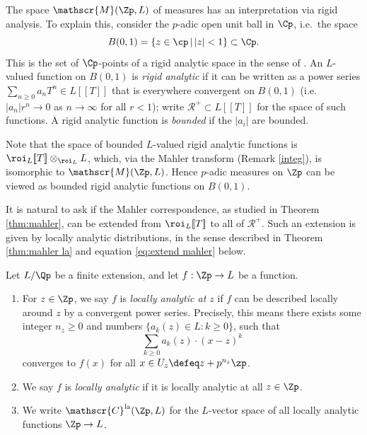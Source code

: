 \documentclass[a4paper,10pt, english, reqno]{smfart}
\newcommand{\lsem}{[\! [}
\newcommand{\rsem}{]\! ]}
\newcommand{\sM}{\mathscr{M}}
\newcommand{\sC}{\mathscr{C}}
\numberwithin{equation}{section}
\begin{document}
\begin{remark}\label{rem:analytic functions}
The space $\sM(\Zp,L)$ of measures has an interpretation via rigid analysis. To explain this, consider the $p$-adic open unit ball in $\Cp$, i.e.\ the space
\[
B(0, 1) = \{ z \in \cp \, | \, |z| < 1 \} \subset \Cp.
\]
This is the set of $\Cp$-points of a rigid analytic space in the sense of \cite{BGR}. An $L$-valued function on $B(0,1)$ is \emph{rigid analytic} if it can be written as a power series $\sum_{n \geq 0}a_n T^n \in L\lsem T\rsem$ that is everywhere convergent on $B(0,1)$ (i.e.\ $|a_n|r^n \to 0$ as $n \to \infty$ for all $r < 1$); write $\mathscr{R}^+ \subset L\lsem T\rsem$ for the space of such functions. A rigid analytic function is \emph{bounded} if the $|a_i|$ are bounded. 

Note that  the space of bounded $L$-valued rigid analytic functions is $\roi_L\lsem T\rsem  \otimes_{\roi_L} L$, which, via the Mahler transform (Remark \ref{integ}), is isomorphic to $\sM(\Zp,L)$. Hence $p$-adic measures on $\Zp$ can be viewed as bounded rigid analytic functions on $B(0, 1)$.
\end{remark}


It is natural to ask if the Mahler correspondence, as studied in Theorem \ref{thm:mahler}, can be extended from $\roi_L\lsem T\rsem$ to all of $\mathscr{R}^+$. Such an extension is given by locally analytic distributions, in the sense described in Theorem \ref{thm:mahler la} and equation \eqref{eq:extend mahler} below.




\begin{definition} \label{DefLocAn}
Let $L/\Qp$ be a finite extension, and let $f : \Zp \to L$
be a function. 
\begin{enumerate}
\item For $z \in \Zp$, we say $f$ is \emph{locally analytic at $z$} if $f$ can be described locally around $z$ by a convergent power series. Precisely, this means there exists some integer $n_z \geq 0$ and numbers $\{a_k(z) \in L : k\geq 0\}$, such that 
\[
    \sum_{k\geq 0}a_k(z) \cdot (x-z)^k
\]
converges to $f(x)$ for all $x \in U_z \defeq z + p^{n_z} \zp$.

\item We say $f$ is \emph{locally analytic} if it is locally analytic at all $z \in \Zp$.

\item We write $\sC^{\mathrm{la}}(\Zp,L)$ for the $L$-vector space of all locally analytic functions $\Zp \to L$.
\end{enumerate}
\end{definition}
\end{document}
